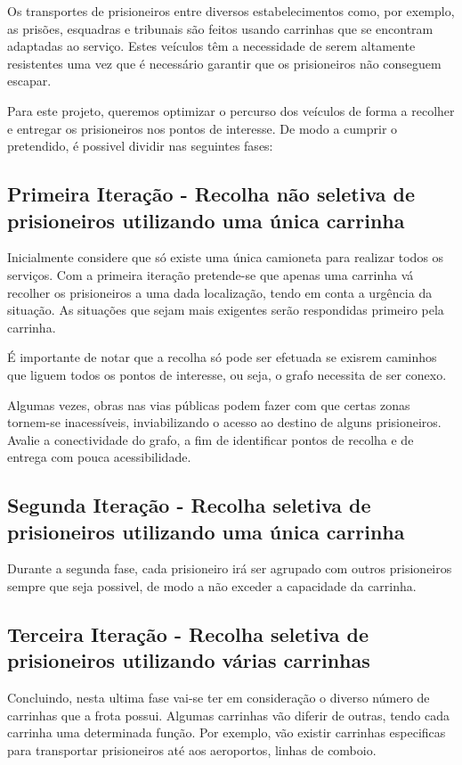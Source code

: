 \documentclass[article, a4paper, 12pt, oneside]{memoir}
\begin{document}
Os transportes de prisioneiros entre diversos estabelecimentos como, por exemplo, as prisões, esquadras e tribunais são feitos usando carrinhas que se encontram adaptadas ao serviço. Estes veículos têm a necessidade de serem altamente resistentes uma vez que é necessário garantir que os prisioneiros não conseguem escapar.

Para este projeto, queremos optimizar o percurso dos veículos de forma a recolher e entregar os prisioneiros nos pontos de interesse. De modo a cumprir o pretendido, é possivel dividir nas seguintes fases:


\subsection{Primeira Iteração - Recolha não seletiva de prisioneiros utilizando uma única carrinha}
	Inicialmente considere que só existe uma única camioneta para realizar todos os serviços.
	Com a primeira iteração pretende-se que apenas uma carrinha vá recolher os prisioneiros a uma dada localização, tendo em conta a urgência da situação. As situações que  sejam mais exigentes serão respondidas primeiro pela carrinha.

	É importante de notar que a recolha só pode ser efetuada se exisrem caminhos que liguem todos os pontos de interesse, ou seja, o grafo necessita de ser conexo.

	Algumas vezes, obras nas vias públicas podem fazer com que certas zonas tornem-se inacessíveis, inviabilizando o acesso ao destino de alguns prisioneiros. Avalie a conectividade do grafo, a fim de identificar pontos de recolha e de entrega com pouca acessibilidade.

\subsection{Segunda Iteração - Recolha seletiva de prisioneiros utilizando uma única carrinha}
	Durante a segunda fase, cada prisioneiro irá ser agrupado com outros prisioneiros sempre que seja possivel, de modo a não exceder a capacidade da carrinha.



\subsection{Terceira Iteração - Recolha seletiva de prisioneiros utilizando várias carrinhas}

	Concluindo, nesta ultima fase vai-se ter em consideração o diverso número de carrinhas que a frota possui. Algumas carrinhas vão diferir de outras, tendo cada carrinha uma determinada função. Por exemplo, vão existir carrinhas especificas para transportar prisioneiros até aos aeroportos, linhas de comboio.
\end{document}
